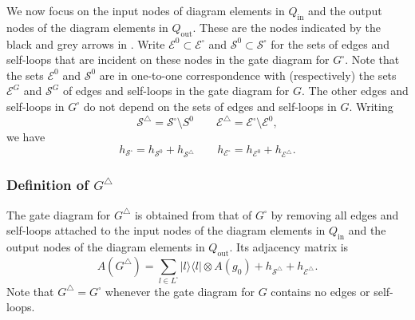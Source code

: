 \documentclass[../thesis-main/thesis-main]{subfiles}
\begin{document}
We now focus on the input nodes of diagram elements in $Q_{\text{in}}$ and the output nodes of the diagram elements in $Q_{\text{out}}$. These are the nodes indicated by the black and grey arrows in . Write $\mathcal{E}^{0}\subset\mathcal{E}^{\square}$ and $\mathcal{S}^{0}\subset\mathcal{S^{\square}}$ for the sets of edges and self-loops that are incident on these nodes in the gate diagram for $G^{\square}$. Note that the sets $\mathcal{E}^{0}$ and $\mathcal{S}^{0}$ are in one-to-one correspondence with (respectively) the sets $\mathcal{E}^{G}$ and $\mathcal{S}^{G}$ of edges and self-loops in the gate diagram for $G$. The other edges and self-loops in $G^{\square}$ do not depend on the sets of edges and self-loops in $G$. Writing
\[
\mathcal{S}^{\triangle}=\mathcal{S}^{\square}\setminus S^{0}\qquad\mathcal{E}^{\triangle}=\mathcal{E}^{\square}\setminus\mathcal{E}^{0},
\]
we have 
\begin{equation}
h_{\mathcal{S}^{\square}}=h_{\mathcal{S}^{0}}+h_{\mathcal{S}^{\triangle}}\qquad h_{\mathcal{E}^{\square}}=h_{\mathcal{E}^{0}}+h_{\mathcal{E}^{\triangle}}.\label{eq:h_se_square}
\end{equation}

\subsubsection*{Definition of $G^{\triangle}$ }

The gate diagram for $G^{\triangle}$ is obtained from that of $G^{\square}$ by removing all edges and self-loops attached to the input nodes of the diagram elements in $Q_{\text{in}}$ and the output nodes of the diagram elements in $Q_{\text{out}}$. Its adjacency matrix is
\begin{equation}
A(G^{\triangle})=\sum_{l\in L^{\square}}|l\rangle\langle l|\otimes A(g_{0})+h_{\mathcal{S}^{\triangle}}+h_{\mathcal{E}^{\triangle}}.\label{eq:A_g_triangle}
\end{equation}
Note that $G^{\triangle}=G^{\square}$ whenever the gate diagram for $G$ contains no edges or self-loops. 
\end{document}
